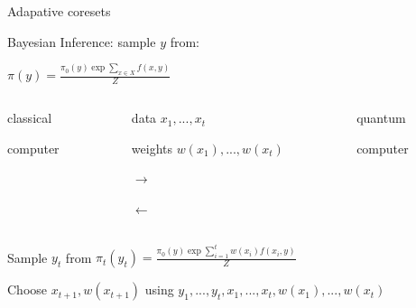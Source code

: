 \documentclass[
  ignorenonframetext,
]{beamer}
\begin{document}
\begin{frame}{Adapative coresets}
\protect\hypertarget{adapative-coresets}{}
\begin{footnotesize}
\end{footnotesize}

Bayesian Inference: sample \(y\) from:

\(\pi(y) = \frac{\pi_{0}(y) \exp{\sum_{x \in X} f(x, y)} } {Z}\)

\pause

\begin{columns}[T]

\begin{column}{.325\textwidth}
\begin{block}{}
\vspace{0.2cm}
\centering
classical 

computer
\vspace{0.2cm}
\end{block}
\end{column}

\begin{column}{.35\textwidth}
\vspace{0.4cm}
\centering
\begin{small}
data $x_1, ..., x_t$

weights $w(x_1), ..., w(x_t)$

\end{small}


$\longrightarrow$

\vspace{-0.2cm}

$\longleftarrow$
\end{column}

\begin{column}{.325\textwidth}
\begin{block}{}
\vspace{0.2cm}
\centering
quantum

computer
\vspace{0.2cm}
\end{block}
\end{column}

\end{columns}

\pause

Sample \(y_t\) from
\(\pi_t(y_t) = \frac{\pi_{0}(y) \exp{\sum_{i=1}^{t} w(x_i) f(x_i, y)} } {Z}\)

\pause

Choose \(x_{t+1}, w(x_{t+1})\) using
\(y_1, ..., y_t, x_1, ..., x_t, w(x_1), ..., w(x_t)\)
\end{frame}
\end{document}
